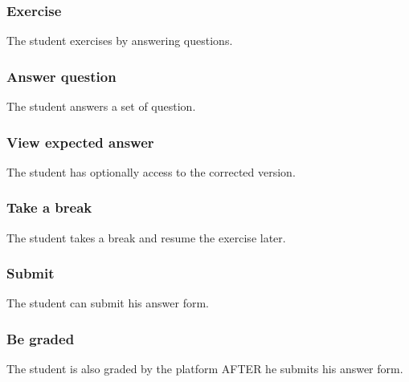 		\subsubsection{Exercise}
			The student exercises by answering questions.
		\subsubsection{Answer question}
			The student answers a set of question.
		\subsubsection{View expected answer}
			The student has optionally access to the corrected version.
		\subsubsection{Take a break}
			The student takes a break and resume the exercise later.
		\subsubsection{Submit}
			The student can submit his answer form.
		\subsubsection{Be graded}
			The student is also graded by the platform AFTER he submits his answer form.		
